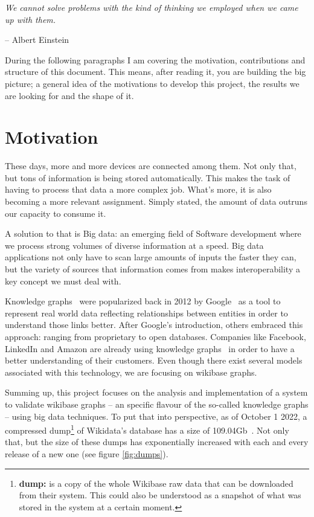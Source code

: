 \epigraph{\textit{We cannot solve problems with the kind of thinking we employed when we came up with them.}}{-- \textup{Albert Einstein}}

During the following paragraphs I am covering the motivation, contributions and structure of this document. This means, after reading it, you are building the big picture; a general idea of the motivations to develop this project, the results we are looking for and the shape of it.

\section{Motivation}

These days, more and more devices are connected among them. Not only that, but tons of information is being stored automatically. This makes the task of having to process that data a more complex job. What's more, it is also becoming a more relevant assignment. Simply stated, the amount of data outruns our capacity to consume it.

A solution to that is Big data: an emerging field of Software development where we process strong volumes of diverse information at a speed. Big data applications not only have to scan large amounts of inputs the faster they can, but the variety of sources that information comes from makes interoperability a key concept we must deal with.

Knowledge graphs~\cite{https://doi.org/10.48550/arxiv.2110.11709} were popularized back in 2012 by Google~\cite{web:knowledge_graphs:google} as a tool to represent real world data reflecting relationships between entities in order to understand those links better. After Google's introduction, others embraced this approach: ranging from proprietary to open databases. Companies like Facebook, LinkedIn and Amazon are already using knowledge graphs~\cite{web:knowledge_graphs:use} in order to have a better understanding of their customers. Even though there exist several models associated with this technology, we are focusing on wikibase graphs.

Summing up, this project focuses on the analysis and implementation of a system to validate wikibase graphs -- an specific flavour of the so-called knowledge graphs -- using big data techniques. To put that into perspective, as of October 1 2022, a compressed dump\footnote{\textbf{dump:} is a copy of the whole Wikibase raw data that can be downloaded from their system. This could also be understood as a snapshot of what was stored in the system at a certain moment.} of Wikidata's database has a size of 109.04Gb~\cite{wikidata:dumps}. Not only that, but the size of these dumps has exponentially increased with each and every release of a new one (see figure \ref{fig:dumps}).

